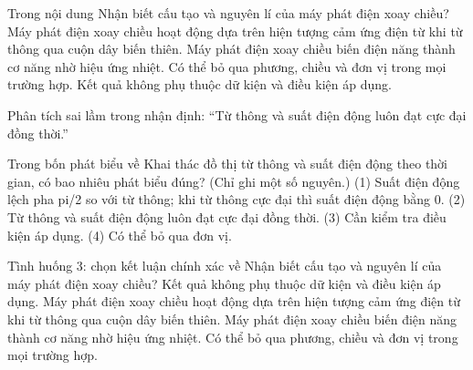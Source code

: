 \begin{ex}
Trong nội dung Nhận biết cấu tạo và nguyên lí của máy phát điện xoay chiều?
\choice
{\True Máy phát điện xoay chiều hoạt động dựa trên hiện tượng cảm ứng điện từ khi từ thông qua cuộn dây biến thiên.}
{Máy phát điện xoay chiều biến điện năng thành cơ năng nhờ hiệu ứng nhiệt.}
{Có thể bỏ qua phương, chiều và đơn vị trong mọi trường hợp.}
{Kết quả không phụ thuộc dữ kiện và điều kiện áp dụng.}
\end{ex}

\begin{bt}
Phân tích sai lầm trong nhận định: “Từ thông và suất điện động luôn đạt cực đại đồng thời.”
\end{bt}

\begin{ex}
Trong bốn phát biểu về Khai thác đồ thị từ thông và suất điện động theo thời gian, có bao nhiêu phát biểu đúng? (Chỉ ghi một số nguyên.) (1) Suất điện động lệch pha pi/2 so với từ thông; khi từ thông cực đại thì suất điện động bằng 0. (2) Từ thông và suất điện động luôn đạt cực đại đồng thời. (3) Cần kiểm tra điều kiện áp dụng. (4) Có thể bỏ qua đơn vị.
\end{ex}

\begin{ex}
Tình huống 3: chọn kết luận chính xác về Nhận biết cấu tạo và nguyên lí của máy phát điện xoay chiều?
\choice
{Kết quả không phụ thuộc dữ kiện và điều kiện áp dụng.}
{\True Máy phát điện xoay chiều hoạt động dựa trên hiện tượng cảm ứng điện từ khi từ thông qua cuộn dây biến thiên.}
{Máy phát điện xoay chiều biến điện năng thành cơ năng nhờ hiệu ứng nhiệt.}
{Có thể bỏ qua phương, chiều và đơn vị trong mọi trường hợp.}
\end{ex}

